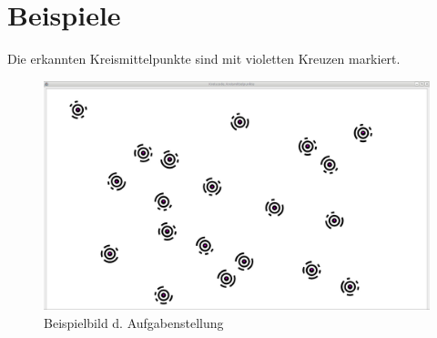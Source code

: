 \section{Beispiele}
Die erkannten Kreismittelpunkte sind mit violetten Kreuzen markiert.
\begin{figure}[!ht]
	\centering	
	\includegraphics[width=\textwidth]{sek1bsp1}
	\caption{Beispielbild d. Aufgabenstellung}
\end{figure}